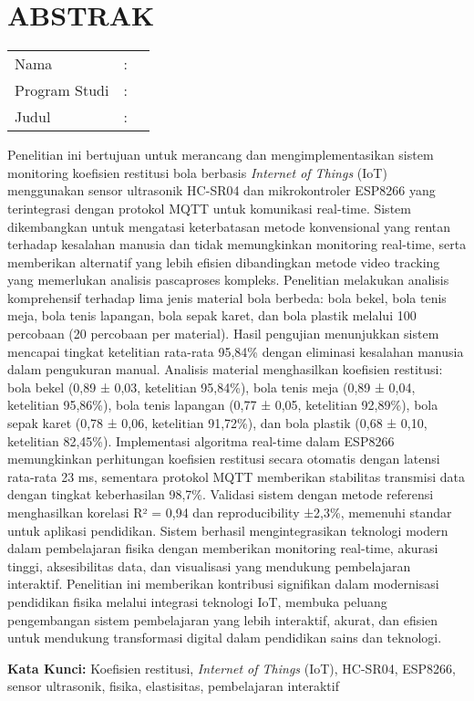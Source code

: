 \chapter*{ABSTRAK} 

\vspace{-2em} %

\begin{table}[htbp]
\begin{tabular}{l l p{10cm}}
	Nama &:& \penulis\\
	Program Studi &:& \jurusan \\
	Judul &:& \judul
\end{tabular}
\end{table}

Penelitian ini bertujuan untuk merancang dan mengimplementasikan sistem monitoring koefisien restitusi bola berbasis \textit{Internet of Things} (IoT) menggunakan sensor ultrasonik HC-SR04 dan mikrokontroler ESP8266 yang terintegrasi dengan protokol MQTT untuk komunikasi real-time. Sistem dikembangkan untuk mengatasi keterbatasan metode konvensional yang rentan terhadap kesalahan manusia dan tidak memungkinkan monitoring real-time, serta memberikan alternatif yang lebih efisien dibandingkan metode video tracking yang memerlukan analisis pascaproses kompleks. Penelitian melakukan analisis komprehensif terhadap lima jenis material bola berbeda: bola bekel, bola tenis meja, bola tenis lapangan, bola sepak karet, dan bola plastik melalui 100 percobaan (20 percobaan per material). Hasil pengujian menunjukkan sistem mencapai tingkat ketelitian rata-rata 95,84\% dengan eliminasi kesalahan manusia dalam pengukuran manual. Analisis material menghasilkan koefisien restitusi: bola bekel (0,89 ± 0,03, ketelitian 95,84\%), bola tenis meja (0,89 ± 0,04, ketelitian 95,86\%), bola tenis lapangan (0,77 ± 0,05, ketelitian 92,89\%), bola sepak karet (0,78 ± 0,06, ketelitian 91,72\%), dan bola plastik (0,68 ± 0,10, ketelitian 82,45\%). Implementasi algoritma real-time dalam ESP8266 memungkinkan perhitungan koefisien restitusi secara otomatis dengan latensi rata-rata 23 ms, sementara protokol MQTT memberikan stabilitas transmisi data dengan tingkat keberhasilan 98,7\%. Validasi sistem dengan metode referensi menghasilkan korelasi R² = 0,94 dan reproducibility ±2,3\%, memenuhi standar untuk aplikasi pendidikan. Sistem berhasil mengintegrasikan teknologi modern dalam pembelajaran fisika dengan memberikan monitoring real-time, akurasi tinggi, aksesibilitas data, dan visualisasi yang mendukung pembelajaran interaktif. Penelitian ini memberikan kontribusi signifikan dalam modernisasi pendidikan fisika melalui integrasi teknologi IoT, membuka peluang pengembangan sistem pembelajaran yang lebih interaktif, akurat, dan efisien untuk mendukung transformasi digital dalam pendidikan sains dan teknologi.

\noindent\textbf{Kata Kunci:} Koefisien restitusi, \textit{Internet of Things} (IoT), HC-SR04, ESP8266, sensor ultrasonik, fisika, elastisitas, pembelajaran interaktif